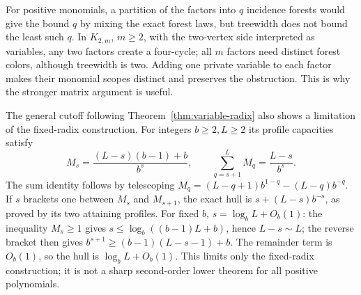 For positive monomials, a partition of the factors into $q$ incidence
forests would give the bound $q$ by mixing the exact forest laws, but
treewidth does not bound the least such $q$. In $K_{2,m}$, $m\ge2$, with the two-vertex
side interpreted as variables, any two factors create a four-cycle;
all $m$ factors need distinct forest colors, although treewidth is two.
Adding one private variable to each factor makes their monomial scopes
distinct and preserves the obstruction. This is why the stronger
matrix argument is useful.

The general cutoff following Theorem~\ref{thm:variable-radix} also
shows a limitation of the fixed-radix construction. For integers
$b\ge2,L\ge2$ its profile capacities satisfy
\[
 M_s=\frac{(L-s)(b-1)+b}{b^s},\qquad
 \sum_{q=s+1}^L M_q=\frac{L-s}{b^s}.
\]
The sum identity follows by telescoping
$M_q=(L-q+1)b^{1-q}-(L-q)b^{-q}$.
If $s$ brackets one between $M_s$ and $M_{s+1}$, the exact hull is
$s+(L-s)b^{-s}$, as proved by its two attaining profiles.
For fixed $b$, $s=\log_b L+O_b(1)$: the inequality $M_s\ge1$ gives
$s\le\log_b((b-1)L+b)$, hence $L-s\sim L$; the reverse bracket then
gives $b^{s+1}\ge(b-1)(L-s-1)+b$. The remainder term is $O_b(1)$,
so the hull is $\log_b L+O_b(1)$. This limits only the fixed-radix
construction; it is not a sharp second-order lower theorem for all
positive polynomials.
